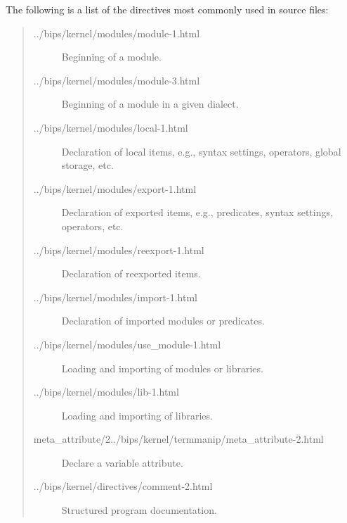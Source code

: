 The following is a list of the directives most commonly used in source files:
\begin{quote}
\begin{description}
\item[%
{../bips/kernel/modules/module-1.html}]
Beginning of a module.

\item[%
{../bips/kernel/modules/module-3.html}]
Beginning of a module in a given dialect.

\item[%
{../bips/kernel/modules/local-1.html}]
Declaration of local items, e.g., syntax settings, operators, global storage,
etc.

\item[%
{../bips/kernel/modules/export-1.html}]
Declaration of exported items, e.g., predicates, syntax settings, operators,
etc.

\item[%
{../bips/kernel/modules/reexport-1.html}]
Declaration of reexported items.

\item[%
{../bips/kernel/modules/import-1.html}]
Declaration of imported modules or predicates.

\item[%
{../bips/kernel/modules/use_module-1.html}]
Loading and importing of modules or libraries.

\item[%
{../bips/kernel/modules/lib-1.html}]
Loading and importing of libraries.

\item[%
{meta_attribute/2}{../bips/kernel/termmanip/meta_attribute-2.html}]
Declare a variable attribute.

\item[%
{../bips/kernel/directives/comment-2.html}]
Structured program documentation.
\end{description}
\end{quote}


